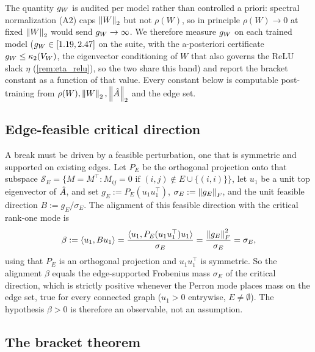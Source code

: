 The quantity $g_W$ is audited per model rather than controlled a priori: spectral normalization (A2)
caps $\left\|W\right\|_2$ but not $\rho(W)$, so in principle $\rho(W)\to0$ at fixed $\left\|W\right\|_2$ would send
$g_W\to\infty$. We therefore measure $g_W$ on each trained model ($g_W\in[1.19,2.47]$ on the suite,
with the a-posteriori certificate $g_W\le\kappa_2(V_W)$, the eigenvector conditioning of $W$ that also governs the ReLU slack $\eta$ (\cref{rem:eta_relu}), so the two share this band) and report
the bracket constant as a function of that value. Every constant below is computable post-training from
$\rho(W),\left\|W\right\|_2,\left\|\hat{A}\right\|_2$ and the edge set.

\subsection{Edge-feasible critical direction}
\label{app:bracket-align}

A break must be driven by a feasible perturbation, one that is symmetric and supported on existing
edges. Let $P_E$ be the orthogonal projection onto that subspace
$\mathcal S_E=\{M=M^\top:M_{ij}=0\text{ if }(i,j)\notin E\cup\{(i,i)\}\}$, let $u_1$ be a unit top
eigenvector of $\hat{A}$, and set $g_E:=P_E(u_1u_1^\top)$, $\sigma_E:=\left\|g_E\right\|_F$, and the unit feasible
direction $B:=g_E/\sigma_E$. The alignment of this feasible direction with the critical rank-one mode is
\begin{equation}
\beta:=\langle u_1,Bu_1\rangle=\frac{\langle u_1,P_E(u_1u_1^\top)u_1\rangle}{\sigma_E}
=\frac{\left\|g_E\right\|_F^2}{\sigma_E}=\sigma_E,
\label{eq:beta-eq}
\end{equation}
using that $P_E$ is an orthogonal projection and $u_1u_1^\top$ is symmetric. So the alignment $\beta$
equals the edge-supported Frobenius mass $\sigma_E$ of the critical direction, which is strictly
positive whenever the Perron mode places mass on the edge set, true for every connected graph
($u_1>0$ entrywise, $E\ne\emptyset$). The hypothesis $\beta>0$ is therefore an observable, not an
assumption.

\subsection{The bracket theorem}
\label{app:bracket-thm}

